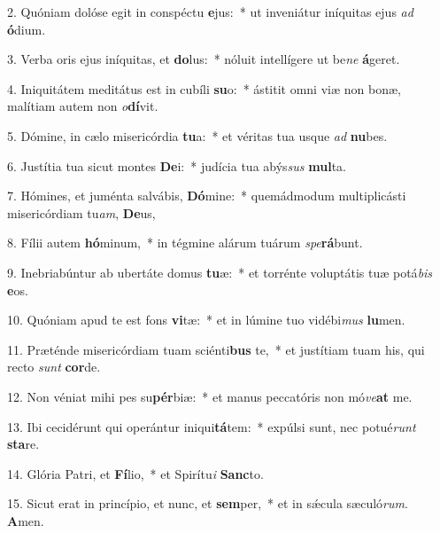 2. Quóniam dolóse egit in conspéctu \textbf{e}jus:~*  ut inveniátur iníquitas ejus \textit{ad} \textbf{ó}dium.\

3. Verba oris ejus iníquitas, et \textbf{do}lus:~*  nóluit intellígere ut be\textit{ne} \textbf{á}geret.\

4. Iniquitátem meditátus est in cubíli \textbf{su}o:~*  ástitit omni viæ non bonæ, malítiam autem non \textit{o}\textbf{dí}vit.\

5. Dómine, in cælo misericórdia \textbf{tu}a:~*  et véritas tua usque \textit{ad} \textbf{nu}bes.\

6. Justítia tua sicut montes \textbf{De}i:~*  judícia tua abýs\textit{sus} \textbf{mul}ta.\

7. Hómines, et juménta salvábis, \textbf{Dó}mine:~*  quemádmodum multiplicásti misericórdiam tu\textit{am}, \textbf{De}us,\

8. Fílii autem \textbf{hó}minum,~*  in tégmine alárum tuárum \textit{spe}\textbf{rá}bunt.\

9. Inebriabúntur ab ubertáte domus \textbf{tu}æ:~*  et torrénte voluptátis tuæ potá\textit{bis} \textbf{e}os.\

10. Quóniam apud te est fons \textbf{vi}tæ:~*  et in lúmine tuo vidébi\textit{mus} \textbf{lu}men.\

11. Præténde misericórdiam tuam sciénti\textbf{bus} te,~*  et justítiam tuam his, qui recto \textit{sunt} \textbf{cor}de.\

12. Non véniat mihi pes su\textbf{pér}biæ:~*  et manus peccatóris non mó\textit{ve}\textbf{at} me.\

13. Ibi cecidérunt qui operántur iniqui\textbf{tá}tem:~*  expúlsi sunt, nec potué\textit{runt} \textbf{sta}re.\

14. Glória Patri, et \textbf{Fí}lio,~*  et Spirítu\textit{i} \textbf{Sanc}to.\

15. Sicut erat in princípio, et nunc, et \textbf{sem}per,~*  et in sǽcula sæculó\textit{rum}. \textbf{A}men.\

